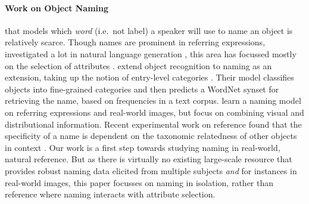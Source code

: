 



\paragraph{Work on Object Naming} that models which \textit{word} (i.e.\ not label) a speaker will use to name an object is relatively scarce.
Though names are prominent in referring expressions, investigated a lot in natural language generation \cite{dale:1995}, this area has focussed mostly on the selection of attributes%
\cite{krahmer:2012}. 
 extend object recognition to naming as an extension, taking up the notion of entry-level categories \cite{rosch1976basic}.
Their model classifies objects into fine-grained categories and then predicts a WordNet synset for retrieving the name,
based on frequencies in a text corpus. 
  learn a naming model on referring expressions and real-world images, but focus on combining visual and distributional information. 
 Recent experimental work on reference found that the specificity of a name is dependent on the taxonomic relatedness of other objects in context
\cite{rohde2012communicating,graf2016animal}. Our work is a first step towards studying naming in real-world, natural reference.
But as there is virtually no existing large-scale resource that provides robust naming data elicited from multiple subjects \textit{and} for instances in real-world images, this paper focusses on naming in isolation, rather than reference where naming interacts with attribute selection.


